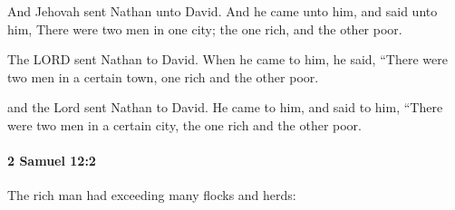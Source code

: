 			\begin{versebox}
					\item[BHS] 
					\item[ASV] And Jehovah sent Nathan unto David. And he came unto him, and said unto him, There were two men in one city; the one rich, and the other poor.
					\item[NIV] The LORD sent Nathan to David. When he came to him, he said, “There were two men in a certain town, one rich and the other poor.
					\item[NRSV] and the Lord sent Nathan to David. He came to him, and said to him, “There were two men in a certain city, the one rich and the other poor.
			\end{versebox}

		\paragraph{2 Samuel 12:2} %
			\label{2SAMUEL-12-2}

			The rich man had exceeding many flocks and herds:


